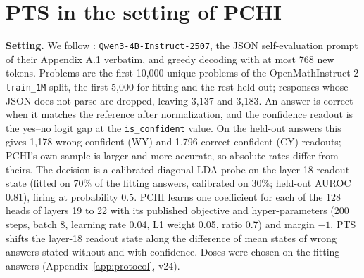 \documentclass{article}
\begin{document}
\section{PTS in the setting of PCHI}
\label{app:pchi}

\textbf{Setting.} We follow \citet{liu2026probe}: \texttt{Qwen3-4B-Instruct-2507},
the JSON self-evaluation prompt of their Appendix A.1 verbatim, and greedy
decoding with at most 768 new tokens. Problems are the first 10{,}000 unique
problems of the OpenMathInstruct-2 \texttt{train\_1M} split, the first 5{,}000
for fitting and the rest held out; responses whose JSON does not parse are
dropped, leaving 3{,}137 and 3{,}183. An answer is correct when it matches the
reference after normalization, and the confidence readout is the yes--no logit
gap at the \texttt{is\_confident} value. On the held-out answers this gives
1{,}178 wrong-confident (WY) and 1{,}796 correct-confident (CY) readouts;
PCHI's own sample is larger and more accurate, so absolute rates differ from
theirs. The decision is a calibrated diagonal-LDA probe on the layer-18 readout
state (fitted on 70\% of the fitting answers, calibrated on 30\%; held-out AUROC
$0.81$), firing at probability $0.5$. PCHI learns one coefficient for each of
the 128 heads of layers 19 to 22 with its published objective and
hyper-parameters (200 steps, batch 8, learning rate 0.04, L1 weight 0.05, ratio
0.7) and margin $-1$. PTS shifts the layer-18 readout state along the
difference of mean states of wrong answers stated without and with confidence.
Doses were chosen on the fitting answers (Appendix~\ref{app:protocol}, v24).

\begin{table}[h]\footnotesize\setlength{\tabcolsep}{5pt}
\centering
{}
\caption{The setting of PCHI on held-out answers. All three registered tests
pass: PTS above PCHI ($+0.084$ $[0.058, 0.110]$), PTS above the global shift,
and PCHI above its permuted coefficients.}
\label{tab:pchi}
\end{table}
\end{document}
